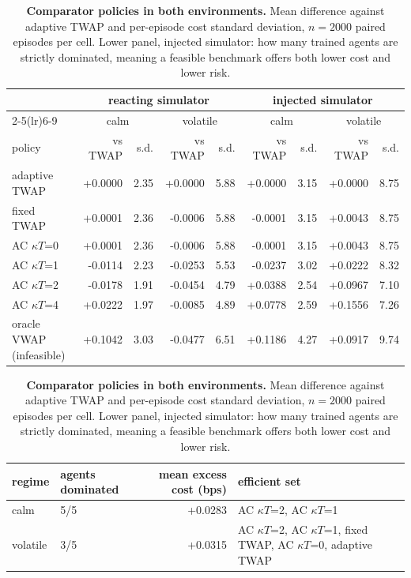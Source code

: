 \begin{table}[htbp]\centering
\caption[Comparator policies in both environments]{\textbf{Comparator policies in both
environments.} Mean difference against adaptive TWAP and per-episode cost standard deviation,
$n=2000$ paired episodes per cell. Lower panel, injected simulator: how many trained agents
are strictly dominated, meaning a feasible benchmark offers both lower cost and lower risk.}
\label{tab:sigext-comparators}
\scriptsize
\setlength{\tabcolsep}{4pt}
\begin{tabular}{lrrrrrrrr}
\toprule
& \multicolumn{4}{c}{reacting simulator} & \multicolumn{4}{c}{injected simulator} \\
\cmidrule(lr){2-5}\cmidrule(lr){6-9}
& \multicolumn{2}{c}{calm} & \multicolumn{2}{c}{volatile} & \multicolumn{2}{c}{calm} & \multicolumn{2}{c}{volatile} \\
policy & vs TWAP & s.d. & vs TWAP & s.d. & vs TWAP & s.d. & vs TWAP & s.d. \\
\midrule
adaptive TWAP & +0.0000 & 2.35 & +0.0000 & 5.88 & +0.0000 & 3.15 & +0.0000 & 8.75 \\
fixed TWAP & +0.0001 & 2.36 & -0.0006 & 5.88 & -0.0001 & 3.15 & +0.0043 & 8.75 \\
AC $\kappa T$=0 & +0.0001 & 2.36 & -0.0006 & 5.88 & -0.0001 & 3.15 & +0.0043 & 8.75 \\
AC $\kappa T$=1 & -0.0114 & 2.23 & -0.0253 & 5.53 & -0.0237 & 3.02 & +0.0222 & 8.32 \\
AC $\kappa T$=2 & -0.0178 & 1.91 & -0.0454 & 4.79 & +0.0388 & 2.54 & +0.0967 & 7.10 \\
AC $\kappa T$=4 & +0.0222 & 1.97 & -0.0085 & 4.89 & +0.0778 & 2.59 & +0.1556 & 7.26 \\
oracle VWAP (infeasible) & +0.1042 & 3.03 & -0.0477 & 6.51 & +0.1186 & 4.27 & +0.0917 & 9.74 \\
\bottomrule
\end{tabular}

\vspace{0.6em}
\begin{tabular}{llrl}
\toprule
regime & agents dominated & mean excess cost (bps) & efficient set \\
\midrule
calm & 5/5 & +0.0283 & AC $\kappa T$=2, AC $\kappa T$=1 \\
volatile & 3/5 & +0.0315 & AC $\kappa T$=2, AC $\kappa T$=1, fixed TWAP, AC $\kappa T$=0, adaptive TWAP \\
\bottomrule
\end{tabular}
\end{table}
